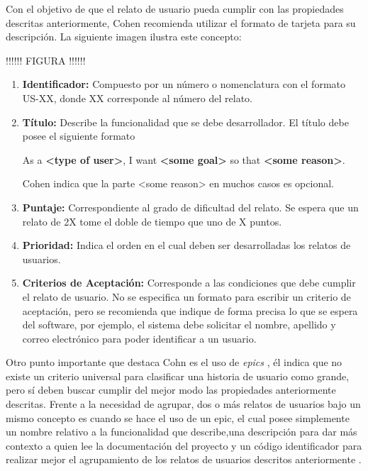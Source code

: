 Con el objetivo de que el relato de usuario pueda cumplir con las propiedades descritas anteriormente, Cohen recomienda utilizar el formato de tarjeta para su descripción. La siguiente imagen ilustra este concepto:

!!!!!! FIGURA !!!!!!

\begin{enumerate}
  \item \textbf{Identificador:} Compuesto por un número o nomenclatura con el formato US-XX, donde XX corresponde al número del relato.
  \item \textbf{Título:} Describe la funcionalidad que se debe desarrollador. El título debe posee el siguiente formato
    \begin{center}
      	As a \textbf{<type of user>}, I want \textbf{<some goal>} so that \textbf{<some reason>}.
    \end{center}

  Cohen \cite{user_stories_applied} indica que la parte <some reason> en muchos casos es opcional.
  \item \textbf{Puntaje:} Correspondiente al grado de dificultad del relato. Se espera que un relato de 2X tome el doble de tiempo que uno de X puntos.
  \item \textbf{Prioridad:} Indica el orden en el cual deben ser desarrolladas los relatos de usuarios.
  \item \textbf{Criterios de Aceptación:} Corresponde a las condiciones que debe cumplir el relato de usuario. No se especifica un formato para escribir un criterio de aceptación, pero se recomienda que indique de forma precisa lo que se espera del software, por ejemplo, el sistema debe solicitar el nombre, apellido y correo electrónico para poder identificar a un usuario.
\end{enumerate}

Otro punto importante que destaca Cohn es el uso de \textit{epics} , él indica que no existe un criterio universal para clasificar una historia de usuario como grande, pero sí deben buscar cumplir del mejor modo las propiedades anteriormente descritas. Frente a la necesidad de agrupar, dos o más relatos de usuarios bajo un mismo concepto es cuando se hace el uso de un epic, el cual posee simplemente un nombre relativo a la funcionalidad que describe,una descripción para dar más contexto a quien lee la documentación del proyecto y un código identificador para realizar mejor el agrupamiento de los relatos de usuarios descritos anteriormente \cite{user_stories_applied}.

